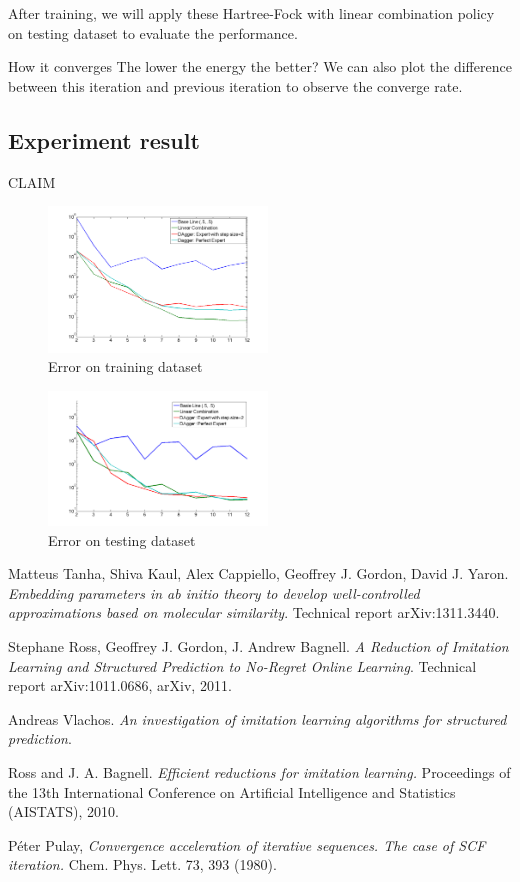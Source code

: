 \documentclass[twoside]{article}
\begin{document}
After training, we will apply these Hartree-Fock with linear combination policy on testing dataset to evaluate the performance.

How it converges
The lower the energy the better?
We can also plot the difference between this iteration and previous iteration to observe the converge rate.


\subsection{Experiment result}

CLAIM \\ 
\begin{figure}[h!]
  \caption{Error on training dataset}
    \includegraphics[width=220px]{DAggerResult_pen_m1-10_env3.png}
\end{figure}

\begin{figure}[h!]
  \caption{Error on testing dataset}
    \includegraphics[width=220px]{DAggerResult.png}
\end{figure}


\begin{thebibliography}{9}
  Matteus Tanha, Shiva Kaul, Alex Cappiello, Geoffrey J. Gordon, David J. Yaron.
  \emph{Embedding parameters in ab initio theory to develop well-controlled approximations based on molecular similarity}.
  Technical report arXiv:1311.3440.
  
  Stephane Ross, Geoffrey J. Gordon, J. Andrew Bagnell.
  \emph{A Reduction of Imitation Learning and Structured Prediction to No-Regret Online Learning}.
  Technical report arXiv:1011.0686, arXiv, 2011.
  
  Andreas Vlachos.
  \emph{An investigation of imitation learning algorithms for structured prediction}.
  
    Ross and J. A. Bagnell.
  \emph{Efficient reductions for imitation
learning.} Proceedings of the 13th International
Conference on Artificial Intelligence and Statistics (AISTATS),
2010.

   Péter Pulay,
  \emph{Convergence acceleration of iterative sequences. The case of SCF iteration.} Chem. Phys. Lett. 73, 393 (1980).

\end{thebibliography}
\end{document}
